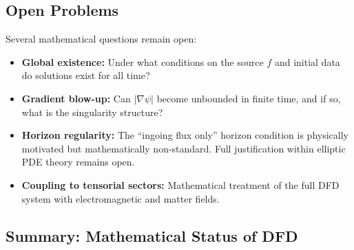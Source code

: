 \subsection{Open Problems}\label{app:well-open}

Several mathematical questions remain open:
\begin{itemize}
\item \textbf{Global existence:} Under what conditions on the source $f$ and 
initial data do solutions exist for all time?
\item \textbf{Gradient blow-up:} Can $|\nabla\psi|$ become unbounded in finite 
time, and if so, what is the singularity structure?
\item \textbf{Horizon regularity:} The ``ingoing flux only'' horizon condition 
is physically motivated but mathematically non-standard. Full justification 
within elliptic PDE theory remains open.
\item \textbf{Coupling to tensorial sectors:} Mathematical treatment of the 
full DFD system with electromagnetic and matter fields.
\end{itemize}

\subsection{Summary: Mathematical Status of DFD}\label{app:well-summary}

